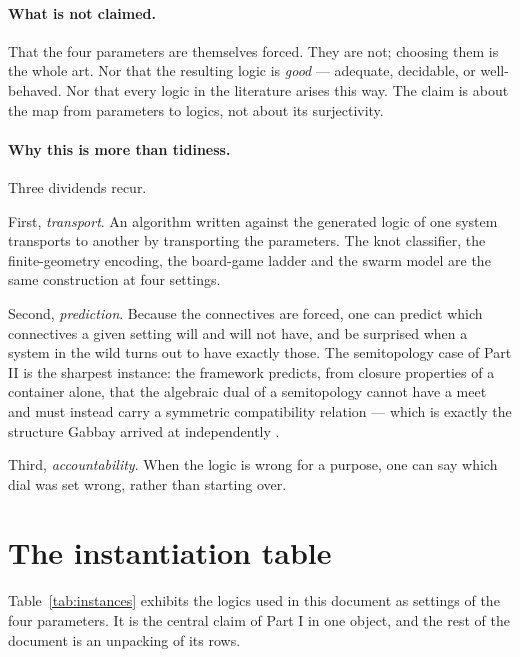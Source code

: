 \paragraph{What is not claimed.} That the four parameters are themselves forced.
They are not; choosing them is the whole art. Nor that the resulting logic is
\emph{good} --- adequate, decidable, or well-behaved. Nor that every logic in the
literature arises this way. The claim is about the map from parameters to logics,
not about its surjectivity.

\paragraph{Why this is more than tidiness.} Three dividends recur.

First, \emph{transport}. An algorithm written against the generated logic of one
system transports to another by transporting the parameters. The knot classifier,
the finite-geometry encoding, the board-game ladder and the swarm model are the
same construction at four settings.

Second, \emph{prediction}. Because the connectives are forced, one can predict
which connectives a given setting will and will not have, and be surprised when a
system in the wild turns out to have exactly those. The semitopology case of
Part II is the sharpest instance: the framework predicts, from closure properties
of a container alone, that the algebraic dual of a semitopology cannot have a
meet and must instead carry a symmetric compatibility relation --- which is
exactly the structure Gabbay arrived at independently \cite{GabbaySemiframes}.

Third, \emph{accountability}. When the logic is wrong for a purpose, one can say
which dial was set wrong, rather than starting over.

\section{The instantiation table}
\label{sec:table}

Table~\ref{tab:instances} exhibits the logics used in this document as settings of
the four parameters. It is the central claim of Part I in one object, and the rest
of the document is an unpacking of its rows.


